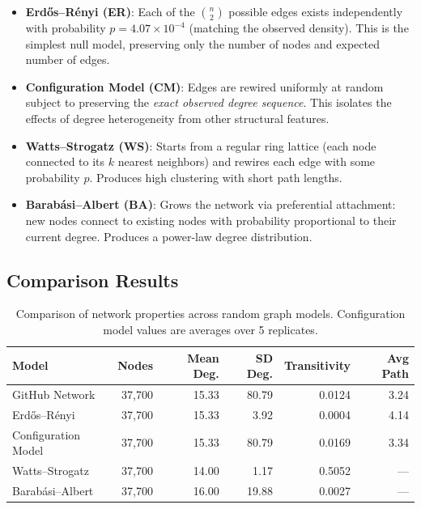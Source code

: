 \documentclass[letterpaper]{article}
\begin{document}
\begin{itemize}
  \item \textbf{Erd\H{o}s--R{\'e}nyi (ER)}: Each of the $\binom{n}{2}$ possible edges exists independently with probability $p = 4.07 \times 10^{-4}$ (matching the observed density). This is the simplest null model, preserving only the number of nodes and expected number of edges.

  \item \textbf{Configuration Model (CM)}: Edges are rewired uniformly at random subject to preserving the \emph{exact observed degree sequence}. This isolates the effects of degree heterogeneity from other structural features.

  \item \textbf{Watts--Strogatz (WS)}: Starts from a regular ring lattice (each node connected to its $k$ nearest neighbors) and rewires each edge with some probability $p$. Produces high clustering with short path lengths.

  \item \textbf{Barab{\'a}si--Albert (BA)}: Grows the network via preferential attachment: new nodes connect to existing nodes with probability proportional to their current degree. Produces a power-law degree distribution.
\end{itemize}

\subsection{Comparison Results}

\begin{table}[H]
  \centering
  \begin{tabular}{lrrrrr}
    \toprule
    \textbf{Model} & \textbf{Nodes} & \textbf{Mean Deg.} & \textbf{SD Deg.} & \textbf{Transitivity} & \textbf{Avg Path} \\
    \midrule
    GitHub Network        & 37,700 & 15.33 & 80.79  & 0.0124 & 3.24 \\
    Erd\H{o}s--R{\'e}nyi  & 37,700 & 15.33 & 3.92   & 0.0004 & 4.14 \\
    Configuration Model   & 37,700 & 15.33 & 80.79  & 0.0169 & 3.34 \\
    Watts--Strogatz       & 37,700 & 14.00 & 1.17   & 0.5052 & ---  \\
    Barab{\'a}si--Albert   & 37,700 & 16.00 & 19.88  & 0.0027 & ---  \\
    \bottomrule
  \end{tabular}
  \caption{Comparison of network properties across random graph models. Configuration model values are averages over 5 replicates.}
  \label{tab:model_comparison}
\end{table}
\end{document}
